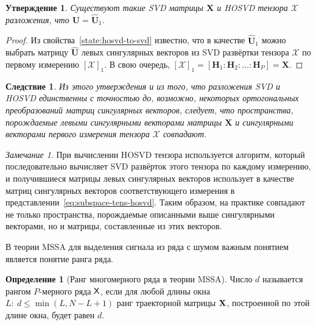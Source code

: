 \documentclass[specialist,
    substylefile = spbu_report.rtx,
    subf,href,colorlinks=true, 12pt]{disser}
\theoremstyle{plain}
\newtheorem{statement}{Утверждение}[section]
\newtheorem{corollary}{Следствие}[statement]
\theoremstyle{definition}
\newtheorem{definition}{Определение}[section]
\theoremstyle{remark}
\newtheorem*{remark}{Замечание}
\begin{document}
    \begin{statement}
        Существуют такие \emph{SVD} матрицы $\mathbf{X}$ и \emph{HOSVD} тензора $\mathcal{X}$ разложения, что
        $\mathbf{U} = \hat{\mathbf{U}}_1$.\label{state:tens-mssa-rank}
    \end{statement}

    \begin{proof}
        Из свойства~\ref{state:hosvd-to-svd} известно, что в качестве $\hat{\mathbf{U}}_1$ можно выбрать матрицу
        $\hat{\mathbf{U}}$ левых сингулярных векторов из SVD развёртки тензора $\mathcal{X}$ по первому измерению $[\mathcal{X}]_{1}$.
        В свою очередь, $[\mathcal{X}]_{1} = [\mathbf{H}_1: \mathbf{H}_2: \ldots: \mathbf{H}_P] = \mathbf{X}$.
    \end{proof}

    \begin{corollary}
        Из этого утверждения и из того, что разложения SVD и HOSVD единственны с точностью
        до, возможно, некоторых ортогональных преобразований матриц сингулярных векторов,
        следует, что пространства, порождаемые левыми сингулярными векторами матрицы $\mathbf{X}$
        и сингулярными векторами первого измерения тензора $\mathcal{X}$ совпадают.
    \end{corollary}

    \begin{remark}
        При вычислении HOSVD тензора используется алгоритм, который последовательно вычисляет SVD развёрток этого тензора
        по каждому измерению, и получившиеся матрицы левых сингулярных векторов использует в качестве матриц сингулярных
        векторов соответствующего измерения в представлении~\eqref{eq:subspace-tens-hosvd}.
        Таким образом, на практике совпадают не только пространства, порождаемые описанными выше сингулярными векторами,
        но и матрицы, составленные из этих векторов.
    \end{remark}

    В теории MSSA для выделения сигнала из ряда с шумом важным понятием является понятие ранга ряда.
    \begin{definition}[Ранг многомерного ряда в теории MSSA]
        Число $d$ называется рангом $P$-мерного ряда $\mathsf{X}$, если для любой длины окна
        $L:\: d \leqslant\min(L, N-L+1)$ ранг траекторной матрицы $\mathbf{X}$, построенной по этой длине окна,
        будет равен $d$.
    \end{definition}
\end{document}
